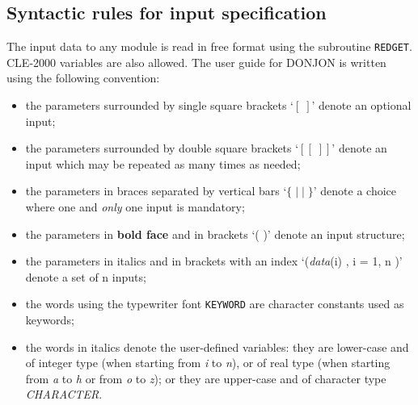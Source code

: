 \subsection{Syntactic rules for input specification}\label{sect:spec}

\vskip 0.2cm
The input data to any module is read in free format using the subroutine 
{\tt REDGET}. CLE-2000 variables\cite{cle2000,gan2} are also allowed.
The user guide for DONJON is written using the following convention:

\begin{itemize}

\item the parameters surrounded by single square brackets `$[\;]$' 
denote an optional input;

\item the parameters surrounded by double square brackets `$[[\;]]$' 
denote an input which may be repeated as many times as needed;

\item the parameters in braces separated by vertical bars `$\{\; |\; |\; \}$' 
denote a choice where one and {\sl only} one input is mandatory;

\item the parameters in {\bf{bold face}} and in brackets `( )' 
denote an input structure;

\item the parameters in italics and in brackets with an index 
`({\it data}(i) ,  i = 1, n )' denote a set of n inputs;

\item the words using the typewriter font {\tt KEYWORD} are
character constants used as keywords;

\item the words in italics denote the user-defined variables:
they are lower-case and of integer type (when starting from
{\it i} to {\it n}), or of real type (when starting from {\it a} to {\it h} or from
{\it o} to {\it z}); or they are upper-case and of character type {\it CHARACTER}.

\end{itemize}
